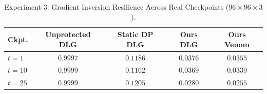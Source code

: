\begin{table}[!t]
\centering
\caption{Experiment 3: Gradient Inversion Resilience Across Real Checkpoints ($96\times 96\times 3$).}
\label{tab:exp3}
\begin{tabular}{lcccc}
\toprule
\textbf{Ckpt.} & \textbf{Unprotected DLG} & \textbf{Static DP DLG} & \textbf{Ours DLG} & \textbf{Ours Venom} \\
\midrule
$t = 1$ & $0.9997$ & $0.1186$ & $\mathbf{0.0376}$ & $\mathbf{0.0355}$ \\
$t = 10$ & $0.9999$ & $0.1162$ & $\mathbf{0.0369}$ & $\mathbf{0.0339}$ \\
$t = 25$ & $0.9999$ & $0.1205$ & $\mathbf{0.0280}$ & $\mathbf{0.0255}$ \\
\bottomrule
\end{tabular}
\end{table}